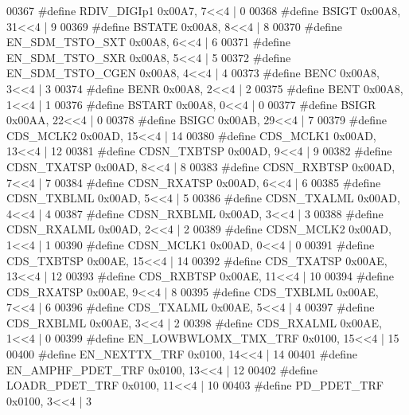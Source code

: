 \begin{DoxyCode}
00367 \textcolor{preprocessor}{#define RDIV\_DIGIp1 0x00A7, 7<<4 |  0}
00368 \textcolor{preprocessor}{#define BSIGT 0x00A8, 31<<4 |  9}
00369 \textcolor{preprocessor}{#define BSTATE 0x00A8, 8<<4 |  8}
00370 \textcolor{preprocessor}{#define EN\_SDM\_TSTO\_SXT 0x00A8, 6<<4 |  6}
00371 \textcolor{preprocessor}{#define EN\_SDM\_TSTO\_SXR 0x00A8, 5<<4 |  5}
00372 \textcolor{preprocessor}{#define EN\_SDM\_TSTO\_CGEN 0x00A8, 4<<4 |  4}
00373 \textcolor{preprocessor}{#define BENC 0x00A8, 3<<4 |  3}
00374 \textcolor{preprocessor}{#define BENR 0x00A8, 2<<4 |  2}
00375 \textcolor{preprocessor}{#define BENT 0x00A8, 1<<4 |  1}
00376 \textcolor{preprocessor}{#define BSTART 0x00A8, 0<<4 |  0}
00377 \textcolor{preprocessor}{#define BSIGR 0x00AA, 22<<4 |  0}
00378 \textcolor{preprocessor}{#define BSIGC 0x00AB, 29<<4 |  7}
00379 \textcolor{preprocessor}{#define CDS\_MCLK2 0x00AD, 15<<4 |  14}
00380 \textcolor{preprocessor}{#define CDS\_MCLK1 0x00AD, 13<<4 |  12}
00381 \textcolor{preprocessor}{#define CDSN\_TXBTSP 0x00AD, 9<<4 |  9}
00382 \textcolor{preprocessor}{#define CDSN\_TXATSP 0x00AD, 8<<4 |  8}
00383 \textcolor{preprocessor}{#define CDSN\_RXBTSP 0x00AD, 7<<4 |  7}
00384 \textcolor{preprocessor}{#define CDSN\_RXATSP 0x00AD, 6<<4 |  6}
00385 \textcolor{preprocessor}{#define CDSN\_TXBLML 0x00AD, 5<<4 |  5}
00386 \textcolor{preprocessor}{#define CDSN\_TXALML 0x00AD, 4<<4 |  4}
00387 \textcolor{preprocessor}{#define CDSN\_RXBLML 0x00AD, 3<<4 |  3}
00388 \textcolor{preprocessor}{#define CDSN\_RXALML 0x00AD, 2<<4 |  2}
00389 \textcolor{preprocessor}{#define CDSN\_MCLK2 0x00AD, 1<<4 |  1}
00390 \textcolor{preprocessor}{#define CDSN\_MCLK1 0x00AD, 0<<4 |  0}
00391 \textcolor{preprocessor}{#define CDS\_TXBTSP 0x00AE, 15<<4 |  14}
00392 \textcolor{preprocessor}{#define CDS\_TXATSP 0x00AE, 13<<4 |  12}
00393 \textcolor{preprocessor}{#define CDS\_RXBTSP 0x00AE, 11<<4 |  10}
00394 \textcolor{preprocessor}{#define CDS\_RXATSP 0x00AE, 9<<4 |  8}
00395 \textcolor{preprocessor}{#define CDS\_TXBLML 0x00AE, 7<<4 |  6}
00396 \textcolor{preprocessor}{#define CDS\_TXALML 0x00AE, 5<<4 |  4}
00397 \textcolor{preprocessor}{#define CDS\_RXBLML 0x00AE, 3<<4 |  2}
00398 \textcolor{preprocessor}{#define CDS\_RXALML 0x00AE, 1<<4 |  0}
00399 \textcolor{preprocessor}{#define EN\_LOWBWLOMX\_TMX\_TRF 0x0100, 15<<4 |  15}
00400 \textcolor{preprocessor}{#define EN\_NEXTTX\_TRF 0x0100, 14<<4 |  14}
00401 \textcolor{preprocessor}{#define EN\_AMPHF\_PDET\_TRF 0x0100, 13<<4 |  12}
00402 \textcolor{preprocessor}{#define LOADR\_PDET\_TRF 0x0100, 11<<4 |  10}
00403 \textcolor{preprocessor}{#define PD\_PDET\_TRF 0x0100, 3<<4 |  3}

\end{DoxyCode}
